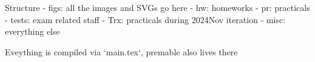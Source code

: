 Structure
- figs: all the images and SVGs go here
- hw: homeworks
- pr: practicals
- tests: exam related staff
- Trx: practicals during 2024Nov iteration
- misc: everything else

Eveything is compiled via `main.tex`, premable also lives there